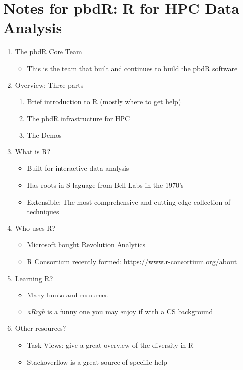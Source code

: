 \documentclass{article}
\begin{document}
\section{Notes for pbdR: R for HPC Data Analysis}
\begin{enumerate}
\item The pbdR Core Team
  \begin{itemize}
  \item This is the team that built and continues to build the pbdR software
  \end{itemize}
\item Overview: Three parts
  \begin{enumerate}
  \item Brief introduction to R (mostly where to get help)
  \item The pbdR infrastructure for HPC
  \item The Demos
  \end{enumerate}
\item What is R?
  \begin{itemize}
  \item Built for interactive data analysis
  \item Has roots in S laguage from Bell Labs in the 1970's
  \item Extensible: The most comprehensive and cutting-edge collection
    of techniques
  \end{itemize}
\item Who uses R?
  \begin{itemize}
  \item Microsoft bought Revolution Analytics
  \item R Consortium recently formed: https://www.r-consortium.org/about
  \end{itemize}
\item Learning R?
  \begin{itemize}
  \item Many books and resources
  \item {\em aRrgh} is a funny one you may enjoy if with a CS background
  \end{itemize}
\item Other resources?
  \begin{itemize}
  \item Task Views: give a great overview of the diversity in R
  \item Stackoverflow is a great source of specific help
  \end{itemize}

\end{enumerate}
\end{document}
